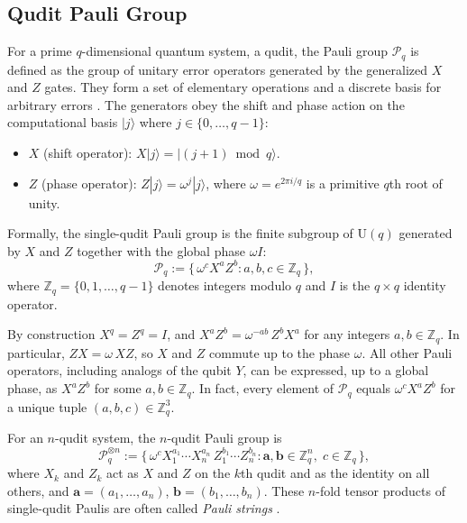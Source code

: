 \subsection{Qudit Pauli Group}
For a prime $q$-dimensional quantum system, a qudit, the Pauli group $\mathcal{P}_q$ is defined as the group of unitary error operators generated by the generalized $X$ and $Z$ gates. They form a set of elementary operations and a discrete basis for arbitrary errors \cite{Gottesman1999,Hostens2005,Wang2020,SarkarYoder2024}.
The generators obey the shift and phase action on the computational basis $|j\rangle$ where $j\in\{0,\ldots,q-1\}$:

\begin{itemize}
    \item $X$ (shift operator): $X|j\rangle = |(j+1)\bmod q\rangle$.

    \item $Z$ (phase operator): $Z|j\rangle = \omega^j|j\rangle$,
    where $\omega = e^{2\pi i/q}$ is a primitive $q$th root of unity.
\end{itemize}

Formally, the single-qudit Pauli group is the finite subgroup of $\mathrm{U}(q)$ generated by $X$ and $Z$ together with the global phase
$\omega I$:
\begin{equation}
  \mathcal{P}_q
  := \bigl\{\, \omega^c X^a Z^b : a,b,c \in \mathbb{Z}_q \,\bigr\},
\end{equation}
where $\mathbb{Z}_q = \{0,1,\dots,q-1\}$ denotes integers modulo $q$ and $I$ is the $q\times q$ identity operator.

By construction $X^q = Z^q = I$, and $X^a Z^b = \omega^{-ab}\, Z^b X^a$ for any integers $a,b \in \mathbb{Z}_q$. In particular, $Z X = \omega\, X Z$, so $X$ and $Z$ commute up to the
phase $\omega$. All other Pauli operators, including analogs of the qubit $Y$, can be expressed, up to a global phase, as $X^a Z^b$ for
some $a,b\in \mathbb{Z}_q$. In fact, every element of $\mathcal{P}_q$ equals $\omega^c X^a Z^b$ for a unique tuple $(a,b,c)\in \mathbb{Z}_q^3$.

For an $n$-qudit system, the $n$-qudit Pauli group is
\begin{equation}
  \mathcal{P}_q^{\otimes n}
  := \bigl\{\, \omega^c
      X_1^{a_1} \cdots X_n^{a_n}\,
      Z_1^{b_1} \cdots Z_n^{b_n}
      : \mathbf{a},\mathbf{b} \in \mathbb{Z}_q^n,\;
        c \in \mathbb{Z}_q
     \,\bigr\},
\end{equation}
where $X_k$ and $Z_k$ act as $X$ and $Z$ on the $k$th qudit and as the identity on all others, and
$\mathbf{a}=(a_1,\dots,a_n)$, $\mathbf{b}=(b_1,\dots,b_n)$.
These $n$-fold tensor products of single-qudit Paulis are often called \emph{Pauli strings} \cite{Hostens2005,SarkarYoder2024}.
